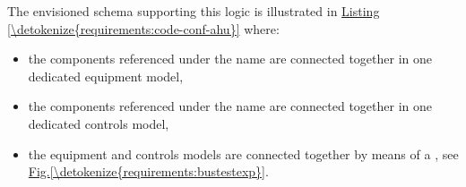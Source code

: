 \documentclass[letterpaper,10pt, openany,english]{sphinxmanual}
\begin{document}
The envisioned schema supporting this logic is illustrated in \hyperref[\detokenize{requirements:code-conf-ahu}]{Listing \ref{\detokenize{requirements:code-conf-ahu}}} where:
\begin{itemize}
\item {} 
the components referenced under the  name are connected together in one dedicated equipment model,

\item {} 
the components referenced under the  name are connected together in one dedicated controls model,

\item {} 
the equipment and controls models are connected together by means of a , see \hyperref[\detokenize{requirements:bustestexp}]{Fig.\@ \ref{\detokenize{requirements:bustestexp}}}.

\end{itemize}
\def\sphinxLiteralBlockLabel{\label{\detokenize{requirements:code-conf-ahu}}}
\end{document}

